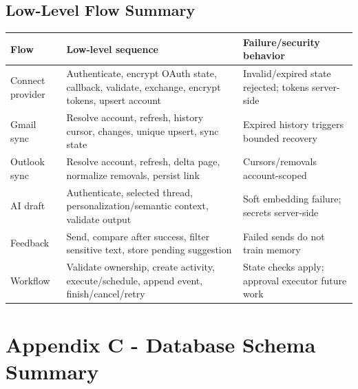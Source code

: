 \documentclass[
]{report}
\begin{document}
\subsection{Low-Level Flow Summary}

\begin{longtable}[]{@{}p{}p{}p{}@{}}
\toprule\noalign{}
Flow & Low-level sequence & Failure/security behavior \\
\midrule\noalign{}
\endhead
\bottomrule\noalign{}
\endlastfoot
Connect provider & Authenticate, encrypt OAuth state, callback, validate, exchange, encrypt tokens, upsert account & Invalid/expired state rejected; tokens server-side \\
Gmail sync & Resolve account, refresh, history cursor, changes, unique upsert, sync state & Expired history triggers bounded recovery \\
Outlook sync & Resolve account, refresh, delta page, normalize removals, persist link & Cursors/removals account-scoped \\
AI draft & Authenticate, selected thread, personalization/semantic context, validate output & Soft embedding failure; secrets server-side \\
Feedback & Send, compare after success, filter sensitive text, store pending suggestion & Failed sends do not train memory \\
Workflow & Validate ownership, create activity, execute/schedule, append event, finish/cancel/retry & State checks apply; approval executor future work \\
\end{longtable}

\section{Appendix C - Database Schema
Summary}\label{appendix-c---database-schema-summary}
\end{document}
